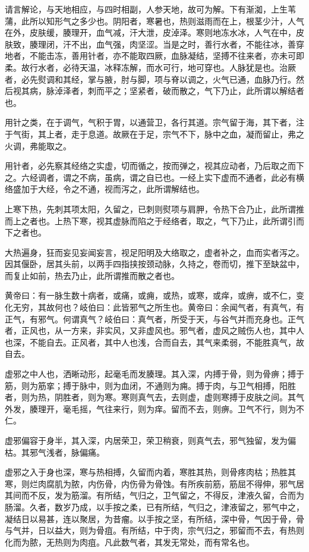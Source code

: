 \documentclass[a4paper,12pt,UTF8,twoside]{ctexbook}
\begin{document}
	请言解论，与天地相应，与四时相副，人参天地，故可为解。下有渐洳，上生苇蒲，此所以知形气之多少也。阴阳者，寒暑也，热则滋雨而在上，根茎少汁，人气在外，皮肤缓，腠理开，血气减，汗大泄，皮淖泽。寒则地冻水冰，人气在中，皮肤致，腠理闭，汗不出，血气强，肉坚涩。当是之时，善行水者，不能往冰，善穿地者，不能击冻，善用针者，亦不能取四厥，血脉凝结，坚搏不往来者，亦未可即柔。故行水者，必待天温，冰释冻解，而水可行，地可穿也。人脉犹是也。治厥者，必先熨调和其经，掌与腋，肘与脚，项与脊以调之，火气已通，血脉乃行。然后视其病，脉淖泽者，刺而平之；坚紧者，破而散之，气下乃止，此所谓以解结者也。
	
	用针之类，在于调气，气积于胃，以通营卫，各行其道。宗气留于海，其下者，注于气街，其上者，走于息道。故厥在于足，宗气不下，脉中之血，凝而留止，弗之火调，弗能取之。
	
	用针者，必先察其经络之实虚，切而循之，按而弹之，视其应动者，乃后取之而下之。六经调者，谓之不病，虽病，谓之自已也。一经上实下虚而不通者，此必有横络盛加于大经，令之不通，视而泻之，此所谓解结也。
	
	上寒下热，先刺其项太阳，久留之，已刺则熨项与肩胛，令热下合乃止，此所谓推而上之者也。上热下寒，视其虚脉而陷之于经络者，取之，气下乃止，此所谓引而下之者也。
	
	大热遍身，狂而妄见妄闻妄言，视足阳明及大络取之，虚者补之，血而实者泻之。因其偃卧，居其头前，以两手四指挟按颈动脉，久持之，卷而切，推下至缺盆中，而复止如前，热去乃止，此所谓推而散之者也。
	
	黄帝曰：有一脉生数十病者，或痛，或痈，或热，或寒，或痒，或痹，或不仁，变化无穷，其故何也？岐伯曰：此皆邪气之所生也。黄帝曰：余闻气者，有真气，有正气，有邪气。何谓真气？岐伯曰：真气者，所受于天，与谷气并而充身也。正气者，正风也，从一方来，非实风，又非虚风也。邪气者，虚风之贼伤人也，其中人也深，不能自去。正风者，其中人也浅，合而自去，其气来柔弱，不能胜真气，故自去。
	
	虚邪之中人也，洒晰动形，起毫毛而发腠理。其入深，内搏于骨，则为骨痹；搏于筋，则为筋挛；搏于脉中，则为血闭，不通则为痈。搏于肉，与卫气相搏，阳胜者，则为热，阴胜者，则为寒。寒则真气去，去则虚，虚则寒搏于皮肤之间。其气外发，腠理开，毫毛摇，气往来行，则为痒。留而不去，则痹。卫气不行，则为不仁。
	
	虚邪偏容于身半，其入深，内居荣卫，荣卫稍衰，则真气去，邪气独留，发为偏枯。其邪气浅者，脉偏痛。
	
	虚邪之入于身也深，寒与热相搏，久留而内着，寒胜其热，则骨疼肉枯；热胜其寒，则烂肉腐肌为脓，内伤骨，内伤骨为骨蚀。有所疾前筋，筋屈不得伸，邪气居其间而不反，发为筋溜。有所结，气归之，卫气留之，不得反，津液久留，合而为肠溜。久者，数岁乃成，以手按之柔，已有所结，气归之，津液留之，邪气中之，凝结日以易甚，连以聚居，为昔瘤。以手按之坚，有所结，深中骨，气因于骨，骨与气并，日以益大，则为骨疽。有所结，中于肉，宗气归之，邪留而不去，有热则化而为脓，无热则为肉疽。凡此数气者，其发无常处，而有常名也。
	
\end{document}
